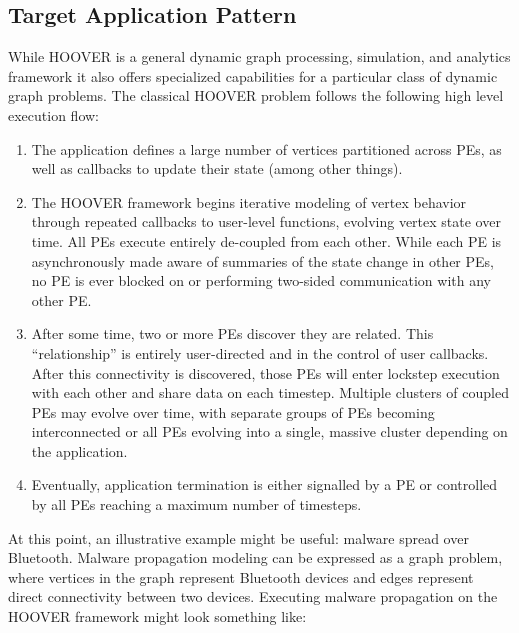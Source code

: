 \subsection{Target Application Pattern}

While HOOVER is a general dynamic graph processing, simulation, and analytics
framework it also offers specialized capabilities for a particular class of
dynamic graph problems. The classical HOOVER problem follows the following high
level execution flow:

\begin{enumerate}
    \item The application defines a large number of vertices partitioned across
        PEs, as well as callbacks to update their state (among other things).
    \item The HOOVER framework begins iterative modeling of vertex behavior
        through repeated callbacks to user-level functions, evolving vertex
        state over time. All PEs execute entirely de-coupled from each other.
        While each PE is asynchronously made aware of summaries of the state
        change in other PEs, no PE is ever blocked on or performing two-sided
        communication with any other PE.
    \item After some time, two or more PEs discover they are related. This
        ``relationship'' is entirely user-directed and in the control of user
        callbacks. After this connectivity is discovered, those PEs will enter
        lockstep execution with each other and share data on each timestep.
        Multiple clusters of coupled PEs may evolve over time, with separate
        groups of PEs becoming interconnected or all PEs evolving into a single,
        massive cluster depending on the application.
    \item Eventually, application termination is either signalled by a PE or
        controlled by all PEs reaching a maximum number of timesteps.
\end{enumerate}

At this point, an illustrative example might be useful: malware spread over
Bluetooth. Malware propagation modeling can be expressed as a graph problem,
where vertices in the graph represent Bluetooth devices and edges represent direct
connectivity between two devices. Executing malware propagation on the
HOOVER framework might look something like:

